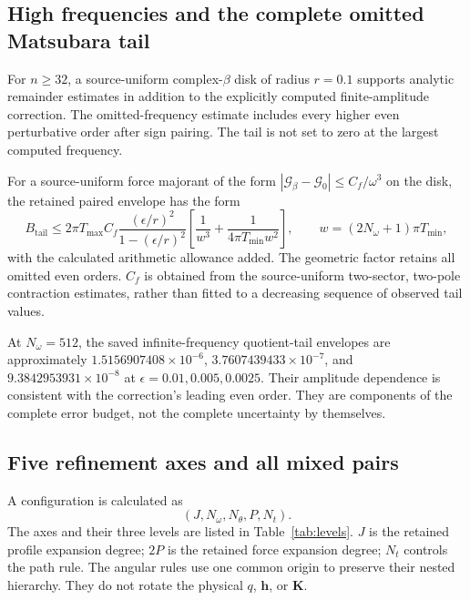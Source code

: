 \subsection{High frequencies and the complete omitted Matsubara tail}
For $n\ge32$, a source-uniform complex-$\beta$ disk of radius $r=0.1$ supports analytic remainder estimates in addition to the explicitly computed finite-amplitude correction. The omitted-frequency estimate includes every higher even perturbative order after sign pairing. The tail is not set to zero at the largest computed frequency.

For a source-uniform force majorant of the form $|\mathcal G_\beta-\mathcal G_0|\le C_f/\omega^3$ on the disk, the retained paired envelope has the form
\begin{equation}\label{eq:tail}
 B_{\mathrm{tail}}\le 2\pi T_{\max} C_f
 \frac{(\epsilon/r)^2}{1-(\epsilon/r)^2}
 \left[\frac{1}{w^3}+\frac{1}{4\pi T_{\min}w^2}\right],
 \qquad w=(2N_\omega+1)\pi T_{\min},
\end{equation}
with the calculated arithmetic allowance added. The geometric factor retains all omitted even orders. $C_f$ is obtained from the source-uniform two-sector, two-pole contraction estimates, rather than fitted to a decreasing sequence of observed tail values.

At $N_\omega=512$, the saved infinite-frequency quotient-tail envelopes are approximately $1.5156907408\times10^{-6}$, $3.7607439433\times10^{-7}$, and $9.3842953931\times10^{-8}$ at $\epsilon=0.01,0.005,0.0025$. Their amplitude dependence is consistent with the correction's leading even order. They are components of the complete error budget, not the complete uncertainty by themselves.

\subsection{Five refinement axes and all mixed pairs}
A configuration is calculated as
\begin{equation}\label{eq:config}
 (J,N_\omega,N_\theta,P,N_t).
\end{equation}
The axes and their three levels are listed in Table~\ref{tab:levels}. $J$ is the retained profile expansion degree; $2P$ is the retained force expansion degree; $N_t$ controls the path rule. The angular rules use one common origin to preserve their nested hierarchy. They do not rotate the physical $q$, $\bm h$, or $\bm K$.

